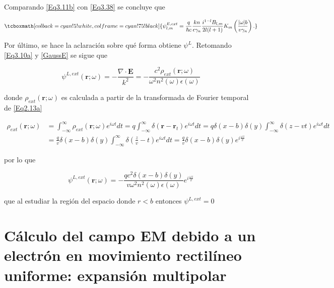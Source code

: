 \documentclass[a4paper,10pt]{article}
\begin{document}
Comparando \eqref{Eq3.11b} con \eqref{Eq3.38} se concluye que

\begin{equation}
\tcboxmath[colback=cyan!5!white,colframe=cyan!75!black]{
\psi_{l,m}^{E,ext}=\frac{q}{\hbar c}\frac{kn}{\epsilon\gamma_n}\frac{i^{1-l}B_{l,m}}{2l(l+1)} K_m\left( \frac{|\omega|b}{v\gamma_n} \right).}
\end{equation}

Por último, se hace la aclaración sobre qué forma obtiene $\psi^L$. Retomando \eqref{Eq3.10a} y \eqref{GaussE} se sigue que

\begin{equation}
\psi^{L,ext}(\textbf{r};\omega)=-\frac{\nabla\cdot\textbf{E}}{k^2}=-\frac{c^2\rho_{ext}(\textbf{r};\omega)}{\omega^2n^2(\omega) \epsilon(\omega)}
\end{equation}

donde $\rho_{ext}(\textbf{r};\omega)$ es calculada a partir de la transformada de Fourier temporal de \eqref{Eq2.13a}

\begin{subequations}
\begin{align}
\rho_{ext}(\textbf{r};\omega)
&=\int_{-\infty}^{\infty}\rho_{ext}(\textbf{r};\omega)e^{i\omega t} dt	=q\int_{-\infty}^{\infty}\delta(\textbf{r}-\textbf{r}_t)e^{i\omega t} dt=q\delta(x-b)\delta(y)\int_{-\infty}^{\infty}\delta(z-vt)e^{i\omega t} dt	\\
&=\frac{q}{v}\delta(x-b)\delta(y)\int_{-\infty}^{\infty}\delta\left(\frac{z}{v}-t\right)e^{i\omega t} dt=\frac{q}{v}\delta(x-b)\delta(y)e^{i\frac{\omega z}{v}}
\end{align}
\end{subequations}

por lo que

\begin{equation}
\psi^{L,ext}(\textbf{r};\omega)=-\frac{qc^2\delta(x-b)\delta(y)}{v\omega^2n^2(\omega)\epsilon(\omega)}e^{i\frac{\omega z}{v}}
\end{equation}

que al estudiar la región del espacio donde $r<b$ entonces $\psi^{L,ext}=0$

\section{\large{Cálculo del campo EM debido a un electrón en movimiento rectilíneo uniforme: expansión multipolar}}

\setcounter{equation}{0}
\end{document}
